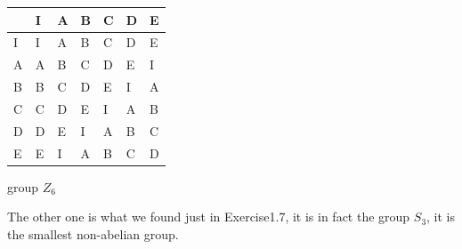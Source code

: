 \documentclass[]{ctexart}
\begin{document}
    \begin{center}
    	\begin{tabular}{l|llllll}
    		\cline{2-7}
    		& \multicolumn{1}{l|}{I} & \multicolumn{1}{l|}{A} & \multicolumn{1}{l|}{B} & \multicolumn{1}{l|}{C} & \multicolumn{1}{l|}{D} & \multicolumn{1}{l|}{E} \\ \hline
    		\multicolumn{1}{|l|}{I} & I                      & A                      & B                      & C                      & D                      & E                      \\ \cline{1-1}
    		\multicolumn{1}{|l|}{A} & A                      & B                      & C                      & D                      & E                      & I                      \\ \cline{1-1}
    		\multicolumn{1}{|l|}{B} & B                      & C                      & D                      & E                      & I                      & A                      \\ \cline{1-1}
    		\multicolumn{1}{|l|}{C} & C                      & D                      & E                      & I                      & A                      & B                      \\ \cline{1-1}
    		\multicolumn{1}{|l|}{D} & D                      & E                      & I                      & A                      & B                      & C                      \\ \cline{1-1}
    		\multicolumn{1}{|l|}{E} & E                      & I                      & A                      & B                      & C                      & D                      \\ \cline{1-1}
    	\end{tabular}
    \centerline{group $Z_6$}
    \end{center}
    
    The other one is what we found just in Exercise1.7, it is in fact the group $S_3$, it is the smallest non-abelian group. 
    
\end{document}
